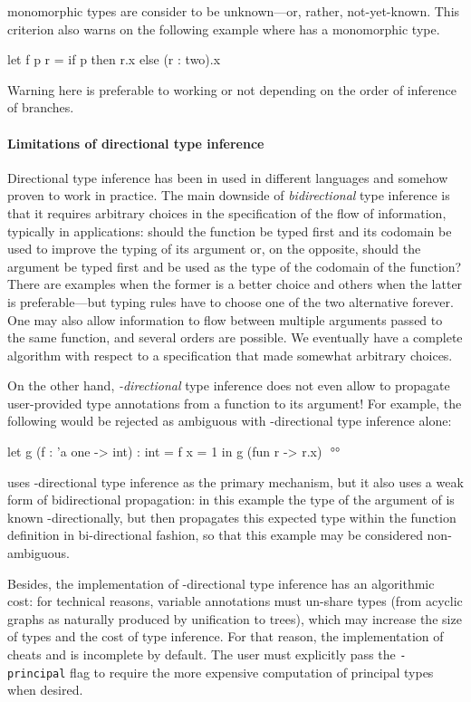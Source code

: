 \documentclass[acmsmall,screen,nonacm,review]{acmart}
\begin{document}
monomorphic types are consider to be unknown---or, rather,
not-yet-known. This criterion also warns on the following example
where  has a monomorphic type.
\begin{program}[input,escapechar={}]
let f p r = if p then r.x else (r : two).x
\end{program}
Warning here is preferable to working or not depending on
the order of inference of  branches.

\paragraph{Limitations of directional type inference}

Directional type inference has been in used in different languages and
somehow proven to work in practice. The main downside of \emph{bidirectional} type inference is
that it requires arbitrary choices in the specification of the flow of
information, typically in applications: should the function be typed first
and its codomain be used to improve the typing of its argument or, on the
opposite, should the argument be typed first and be used as the type of the
codomain of the function?  There are examples when the former is a better
choice and others when the latter is preferable---but typing rules have to
choose one of the two alternative forever.  One may also allow information
to flow between multiple arguments passed to the same function, and several orders are possible. We eventually
have a complete algorithm with respect to a specification that made somewhat
arbitrary choices.

On the other hand, \emph{\Geninst-directional} type inference does not even
allow to propagate user-provided type annotations from a function to its
argument! For example, the following would be rejected as ambiguous with
\geninst-directional type inference alone:
\begin{program}[input]
let g (f : 'a one -> int) : int = f {x = 1} in g (fun r -> r.x) $
$ °°
\end{program}

\OCaml uses \geninst-directional type inference as the
primary mechanism, but it also uses a weak form of bidirectional propagation: in this example the type of the argument of  is known \Geninst-directionally, but \OCaml then propagates this expected type within the function definition in bi-directional fashion, so that this example may be considered non-ambiguous.

Besides, the implementation of \geninst-directional type inference has an
algorithmic cost: for technical reasons, variable annotations must un-share
types (from acyclic graphs as naturally produced by unification to trees),
which may increase the size of types and the cost of type inference. For
that reason, the implementation of \OCaml cheats and is incomplete by
default. The user must explicitly pass the \texttt{\small -principal} flag to
require the more expensive computation of principal types when desired.
\end{document}
